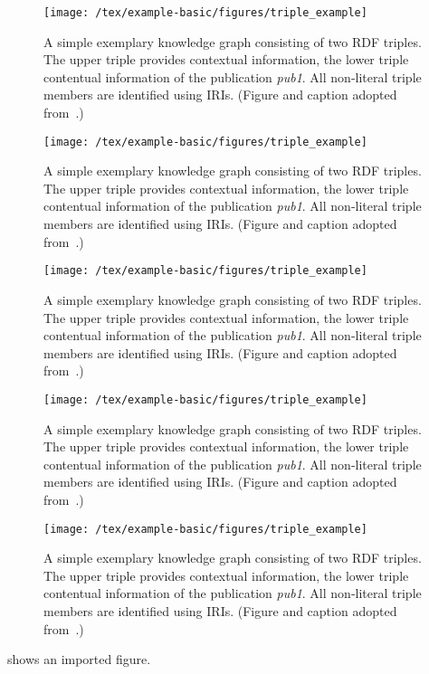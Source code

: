 \begin{figure}[htb!]
\centering
\texttt{[image: /tex/example-basic/figures/triple\_example]}
\caption{A simple exemplary knowledge graph consisting of two RDF triples. The upper triple provides contextual information, the lower triple contentual information of the publication \emph{{pub1}}. All non-literal triple members are identified using IRIs. (Figure and caption adopted from~\cite{Martin21}.)}
\label{fig:contentual-contextual15}
\end{figure}
\begin{figure}[htb!]
\centering
\texttt{[image: /tex/example-basic/figures/triple\_example]}
\caption{A simple exemplary knowledge graph consisting of two RDF triples. The upper triple provides contextual information, the lower triple contentual information of the publication \emph{{pub1}}. All non-literal triple members are identified using IRIs. (Figure and caption adopted from~\cite{Martin21}.)}
\label{fig:contentual-contextual16}
\end{figure}
\begin{figure}[htb!]
\centering
\texttt{[image: /tex/example-basic/figures/triple\_example]}
\caption{A simple exemplary knowledge graph consisting of two RDF triples. The upper triple provides contextual information, the lower triple contentual information of the publication \emph{{pub1}}. All non-literal triple members are identified using IRIs. (Figure and caption adopted from~\cite{Martin21}.)}
\label{fig:contentual-contextual17}
\end{figure}
\begin{figure}[htb!]
\centering
\texttt{[image: /tex/example-basic/figures/triple\_example]}
\caption{A simple exemplary knowledge graph consisting of two RDF triples. The upper triple provides contextual information, the lower triple contentual information of the publication \emph{{pub1}}. All non-literal triple members are identified using IRIs. (Figure and caption adopted from~\cite{Martin21}.)}
\label{fig:contentual-contextual18}
\end{figure}
\begin{figure}[htb!]
\centering
\texttt{[image: /tex/example-basic/figures/triple\_example]}
\caption{A simple exemplary knowledge graph consisting of two RDF triples. The upper triple provides contextual information, the lower triple contentual information of the publication \emph{{pub1}}. All non-literal triple members are identified using IRIs. (Figure and caption adopted from~\cite{Martin21}.)}
\label{fig:contentual-contextual19}
\end{figure}
 shows an imported figure.

